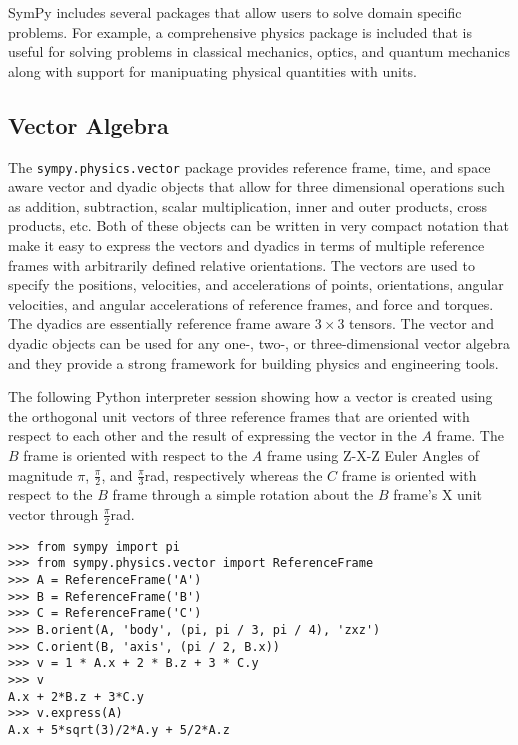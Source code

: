 SymPy includes several packages that allow users to solve domain specific
problems. For example, a comprehensive physics package is included that is
useful for solving problems in classical mechanics, optics, and quantum
mechanics along with support for manipuating physical quantities with units.

\subsection{Vector Algebra}

The \verb|sympy.physics.vector| package provides reference frame, time, and
space aware vector and dyadic objects that allow for three dimensional
operations such as addition, subtraction, scalar multiplication, inner and
outer products, cross products, etc. Both of these objects can be written in
very compact notation that make it easy to express the vectors and dyadics in
terms of multiple reference frames with arbitrarily defined relative
orientations. The vectors are used to specify the positions, velocities, and
accelerations of points, orientations, angular velocities, and angular
accelerations of reference frames, and force and torques. The dyadics are
essentially reference frame aware $3 \times 3$ tensors. The vector and dyadic
objects can be used for any one-, two-, or three-dimensional vector algebra and
they provide a strong framework for building physics and engineering tools.

The following Python interpreter session showing how a vector is created using
the orthogonal unit vectors of three reference frames that are oriented with
respect to each other and the result of expressing the vector in the $A$
frame. The $B$ frame is oriented with respect to the $A$ frame using Z-X-Z
Euler Angles of magnitude $\pi$, $\frac{\pi}{2}$, and
$\frac{\pi}{3}$\si{\radian}, respectively whereas the $C$ frame is oriented
with respect to the $B$ frame through a simple rotation about the $B$ frame's
X unit vector through $\frac{\pi}{2}$\si{\radian}.

\begin{verbatim}
>>> from sympy import pi
>>> from sympy.physics.vector import ReferenceFrame
>>> A = ReferenceFrame('A')
>>> B = ReferenceFrame('B')
>>> C = ReferenceFrame('C')
>>> B.orient(A, 'body', (pi, pi / 3, pi / 4), 'zxz')
>>> C.orient(B, 'axis', (pi / 2, B.x))
>>> v = 1 * A.x + 2 * B.z + 3 * C.y
>>> v
A.x + 2*B.z + 3*C.y
>>> v.express(A)
A.x + 5*sqrt(3)/2*A.y + 5/2*A.z
\end{verbatim}

